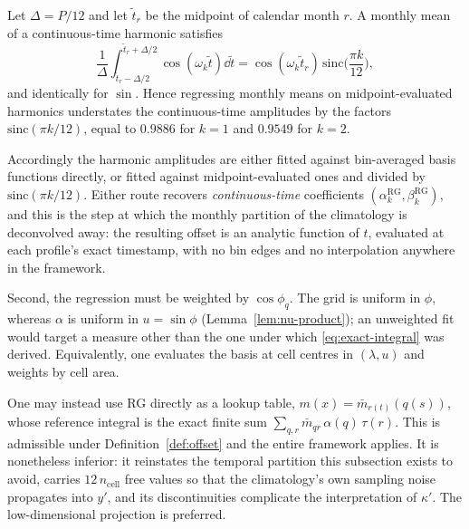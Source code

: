 \begin{lemma}
\label{lem:bin-average}
Let $\Delta=P/12$ and let $\tilde t_r$ be the midpoint of calendar month
$r$. A monthly mean of a continuous-time harmonic satisfies
\[
  \frac1\Delta\int_{\tilde t_r-\Delta/2}^{\tilde t_r+\Delta/2}
    \cos(\omega_k\tilde t)\dd\tilde t
  =\cos(\omega_k\tilde t_r)\,
   \mathrm{sinc}\!\Big(\frac{\pi k}{12}\Big),
\]
and identically for $\sin$. Hence regressing monthly means on
midpoint-evaluated harmonics understates the continuous-time amplitudes
by the factors $\mathrm{sinc}(\pi k/12)$, equal to $0.9886$ for $k=1$ and
$0.9549$ for $k=2$.
\end{lemma}

Accordingly the harmonic amplitudes are either fitted against
bin-averaged basis functions directly, or fitted against
midpoint-evaluated ones and divided by $\mathrm{sinc}(\pi k/12)$. Either
route recovers \emph{continuous-time} coefficients
$(\alpha^{\mathrm{RG}}_k,\beta^{\mathrm{RG}}_k)$, and this is the step at
which the monthly partition of the climatology is deconvolved away: the
resulting offset is an analytic function of $t$, evaluated at each
profile's exact timestamp, with no bin edges and no interpolation
anywhere in the framework.

Second, the regression must be weighted by $\cos\phi_q$. The grid is
uniform in $\phi$, whereas $\alpha$ is uniform in $u=\sin\phi$
(Lemma~\ref{lem:nu-product}); an unweighted fit would target a measure
other than the one under which \eqref{eq:exact-integral} was derived.
Equivalently, one evaluates the basis at cell centres in $(\lambda,u)$
and weights by cell area.

\begin{remark}
\label{rem:lookup}
One may instead use RG directly as a lookup table,
$m(x)=\bar m_{r(t)}(q(s))$, whose reference integral is the exact finite
sum $\sum_{q,r}\bar m_{qr}\,\alpha(q)\,\tau(r)$. This is admissible under
Definition~\ref{def:offset} and the entire framework applies. It is
nonetheless inferior: it reinstates the temporal partition this
subsection exists to avoid, carries $12\,n_{\mathrm{cell}}$ free values so that the
climatology's own sampling noise propagates into $y'$, and its
discontinuities complicate the interpretation of $\kappa'$. The
low-dimensional projection is preferred.
\end{remark}

